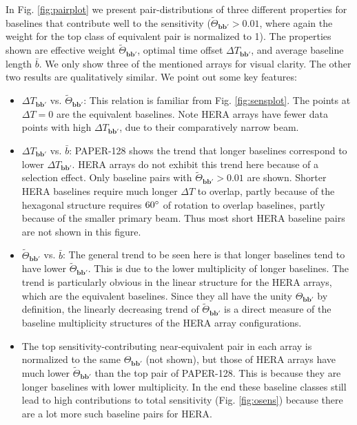 \documentclass[twocolumn,apj,numberedappendix]{emulateapj}
\renewcommand\[{\begin{equation}}
\renewcommand\]{\end{equation}}
\begin{document}
In Fig. \ref{fig:pairplot} we present pair-distributions of three different properties for baselines that contribute well to the sensitivity ($\widetilde{\Theta}_{\boldsymbol{bb'}}>0.01$, where again the weight for the top class of equivalent pair is normalized to 1). The properties shown are effective weight $\widetilde{\Theta}_{\boldsymbol{bb'}}$, optimal time offset $\Delta T_{\boldsymbol{bb'}}$, and average baseline length $\bar{b}$. We only show three of the mentioned arrays for visual clarity. The other two results are qualitatively similar. We point out some key features:
\begin{itemize}

\item $\Delta T_{\boldsymbol{bb'}}$ vs. $\widetilde{\Theta}_{\boldsymbol{bb'}}$:
This relation  is familiar from Fig. \ref{fig:sensplot}. The points at $\Delta T=0$ are the equivalent baselines. Note HERA arrays have fewer data points with high $\Delta T_{\boldsymbol{bb'}}$, due to their comparatively narrow beam. 

\item $\Delta T_{\boldsymbol{bb'}}$ vs. $\bar{b}$:
PAPER-128 shows the trend that longer baselines correspond to lower $\Delta T_{\boldsymbol{bb'}}$. HERA arrays do not exhibit this trend here because of a selection effect. Only baseline pairs with $\widetilde{\Theta}_{\boldsymbol{bb'}}>0.01$ are shown. Shorter HERA baselines require much longer $\Delta T$ to overlap, partly because of the hexagonal structure requires $60\degree$ of rotation to overlap baselines, partly because of the smaller primary beam. Thus most short HERA baseline pairs are not shown in this figure.


\item $\widetilde{\Theta}_{\boldsymbol{bb'}}$ vs. $\bar{b}$:
The general trend to be seen here is that longer baselines tend to have lower $\widetilde{\Theta}_{\boldsymbol{bb'}}$. This is due to the lower multiplicity of longer baselines. The trend is particularly obvious in the linear structure for the HERA arrays, which are the equivalent baselines. Since they all have the unity $\Theta_{\boldsymbol{bb'}}$ by definition, the linearly decreasing trend of $\widetilde{\Theta}_{\boldsymbol{bb'}}$ is a direct measure of the baseline multiplicity structures of the HERA array configurations.

\item The top sensitivity-contributing near-equivalent pair in each array is normalized to the same $\Theta_{\boldsymbol{bb'}}$ (not shown), but those of HERA arrays have much lower $\widetilde{\Theta}_{\boldsymbol{bb'}}$ than the top pair of PAPER-128. This is because they are longer baselines with lower multiplicity. In the end these baseline classes still lead to high contributions to total sensitivity (Fig. \ref{fig:osens}) because there are a lot more such baseline pairs for HERA.  

\end{itemize}
\end{document}
